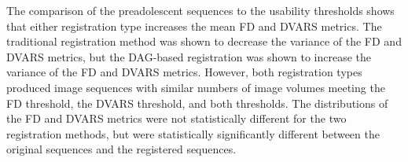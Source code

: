 The comparison of the preadolescent sequences to the usability thresholds shows that either registration type increases the mean FD and DVARS metrics. The traditional registration method was shown to decrease the variance of the FD and DVARS metrics, but the DAG-based registration was shown to increase the variance of the FD and DVARS metrics. However, both registration types produced image sequences with similar numbers of image volumes meeting the FD threshold, the DVARS threshold, and both thresholds. The distributions of the FD and DVARS metrics were not statistically different for the two registration methods, but were statistically significantly different between the original sequences and the registered sequences.





%

